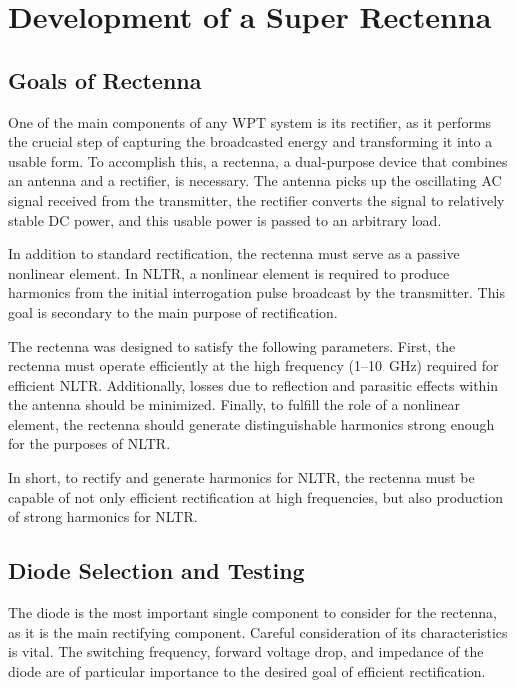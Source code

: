\chapter{Development of a Super Rectenna}
\label{ch:rectenna}

\section{Goals of Rectenna}
\label{sec:rectenna-goals}

One of the main components of any WPT system is its rectifier, as it performs the crucial step of capturing the broadcasted energy and transforming it into a usable form. To accomplish this, a rectenna, a dual-purpose device that combines an antenna and a rectifier, is necessary. The antenna picks up the oscillating AC signal received from the transmitter, the rectifier converts the signal to relatively stable DC power, and this usable power is passed to an arbitrary load.

In addition to standard rectification, the rectenna must serve as a passive nonlinear element. In NLTR, a nonlinear element is required to produce harmonics from the initial interrogation pulse broadcast by the transmitter. This goal is secondary to the main purpose of rectification.

The rectenna was designed to satisfy the following parameters. First, the rectenna must operate efficiently at the high frequency (\numrange{1}{10}~GHz) required for efficient NLTR. Additionally, losses due to reflection and parasitic effects within the antenna should be minimized. Finally, to fulfill the role of a nonlinear element, the rectenna should generate distinguishable harmonics strong enough for the purposes of NLTR.

In short, to rectify and generate harmonics for NLTR, the rectenna must be capable of not only efficient rectification at high frequencies, but also production of strong harmonics for NLTR.

\section{Diode Selection and Testing}
\label{sec:rectenna-diode}

The diode is the most important single component to consider for the rectenna, as it is the main rectifying component. Careful consideration of its characteristics is vital. The switching frequency, forward voltage drop, and impedance of the diode are of particular importance to the desired goal of efficient rectification.

